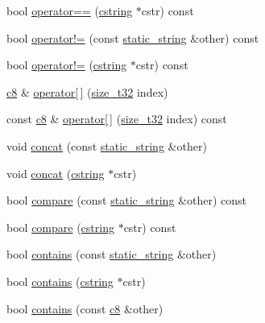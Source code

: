 \begin{DoxyCompactItemize}
\item 
bool \hyperlink{classcrap_1_1static__string_adcc51a627f454f0eeb92b454bc2fca4d}{operator==} (\hyperlink{types_8h_a5849681cb91aa8afef6996d9d9e90881}{cstring} $\ast$cstr) const 
\item 
bool \hyperlink{classcrap_1_1static__string_a9d345213c368dae1cd2ed4baa67c8e9d}{operator!=} (const \hyperlink{classcrap_1_1static__string}{static\-\_\-string} \&other) const 
\item 
bool \hyperlink{classcrap_1_1static__string_a7c03171e5e4b78cb06d2f8b2fe5e3c97}{operator!=} (\hyperlink{types_8h_a5849681cb91aa8afef6996d9d9e90881}{cstring} $\ast$cstr) const 
\item 
\hyperlink{types_8h_aa1ba8aac9fcd831012308297336ac74b}{c8} \& \hyperlink{classcrap_1_1static__string_aa3b0e1dec3e338c823915ca243cc5598}{operator\mbox{[}$\,$\mbox{]}} (\hyperlink{types_8h_a38c0a12279ffe0fabec44939e753c914}{size\-\_\-t32} index)
\item 
const \hyperlink{types_8h_aa1ba8aac9fcd831012308297336ac74b}{c8} \& \hyperlink{classcrap_1_1static__string_a30c88a298dcc6d8bcd72264949a9da1e}{operator\mbox{[}$\,$\mbox{]}} (\hyperlink{types_8h_a38c0a12279ffe0fabec44939e753c914}{size\-\_\-t32} index) const 
\item 
void \hyperlink{classcrap_1_1static__string_a9bc69ea62fb9cbcafec6a12a383de24b}{concat} (const \hyperlink{classcrap_1_1static__string}{static\-\_\-string} \&other)
\item 
void \hyperlink{classcrap_1_1static__string_a242b130d6a27e8ca19470efbb684635d}{concat} (\hyperlink{types_8h_a5849681cb91aa8afef6996d9d9e90881}{cstring} $\ast$cstr)
\item 
bool \hyperlink{classcrap_1_1static__string_ae9177cdc25cd6c8c9a4b347ee688d3e3}{compare} (const \hyperlink{classcrap_1_1static__string}{static\-\_\-string} \&other) const 
\item 
bool \hyperlink{classcrap_1_1static__string_ad8eb8b685402016809ed1cb930452930}{compare} (\hyperlink{types_8h_a5849681cb91aa8afef6996d9d9e90881}{cstring} $\ast$cstr) const 
\item 
bool \hyperlink{classcrap_1_1static__string_accd6e85657f658644b3d706e884c28ef}{contains} (const \hyperlink{classcrap_1_1static__string}{static\-\_\-string} \&other)
\item 
bool \hyperlink{classcrap_1_1static__string_aaa042894cdb77855cd1aa5a6304c05eb}{contains} (\hyperlink{types_8h_a5849681cb91aa8afef6996d9d9e90881}{cstring} $\ast$cstr)
\item 
bool \hyperlink{classcrap_1_1static__string_af96f68b9b253ec50ee88cfdf2330b6a3}{contains} (const \hyperlink{types_8h_aa1ba8aac9fcd831012308297336ac74b}{c8} \&other)

\end{DoxyCompactItemize}
